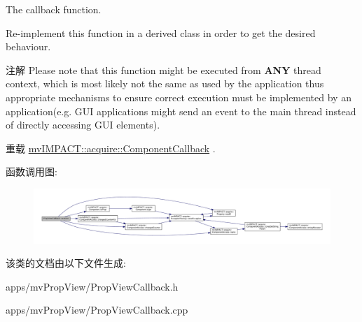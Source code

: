 The callback function. 

Re-\/implement this function in a derived class in order to get the desired behaviour.

\begin{DoxyNote}{注解}
Please note that this function might be executed from {\bfseries A\+N\+Y} thread context, which is most likely not the same as used by the application thus appropriate mechanisms to ensure correct execution must be implemented by an application(e.\+g. G\+U\+I applications might send an event to the main thread instead of directly accessing G\+U\+I elements). 
\end{DoxyNote}


重载 \hyperlink{classmv_i_m_p_a_c_t_1_1acquire_1_1_component_callback_a043e5e1faaa00a954dcb1eb9b765988d}{mv\+I\+M\+P\+A\+C\+T\+::acquire\+::\+Component\+Callback} .



函数调用图\+:
\nopagebreak
\begin{figure}[H]
\begin{center}
\leavevmode
\includegraphics[width=350pt]{class_prop_view_callback_a1e8b3138bb1074e64b86715f269e59c1_cgraph}
\end{center}
\end{figure}




该类的文档由以下文件生成\+:\begin{DoxyCompactItemize}
\item 
apps/mv\+Prop\+View/Prop\+View\+Callback.\+h\item 
apps/mv\+Prop\+View/Prop\+View\+Callback.\+cpp\end{DoxyCompactItemize}
